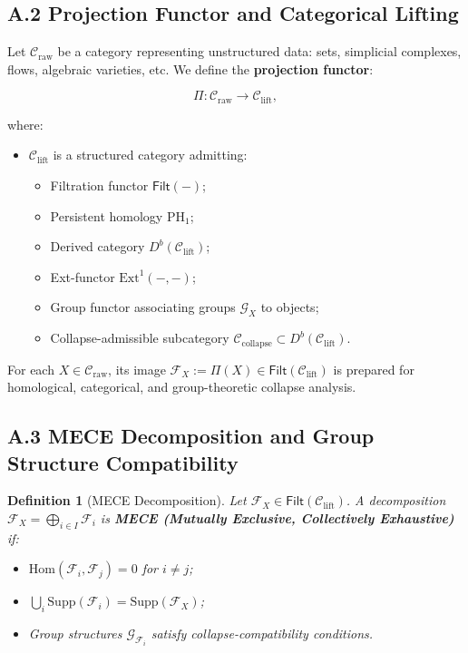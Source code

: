 \documentclass[11pt]{article}
\newtheorem{definition}[theorem]{Definition}
\begin{document}
\subsection*{A.2 Projection Functor and Categorical Lifting}

Let \( \mathcal{C}_{\mathrm{raw}} \) be a category representing unstructured data: sets, simplicial complexes, flows, algebraic varieties, etc. We define the \textbf{projection functor}:

\[
\Pi : \mathcal{C}_{\mathrm{raw}} \longrightarrow \mathcal{C}_{\mathrm{lift}},
\]

where:

\begin{itemize}
    \item \( \mathcal{C}_{\mathrm{lift}} \) is a structured category admitting:
    \begin{itemize}
        \item Filtration functor \( \mathsf{Filt}(-) \);
        \item Persistent homology \( \mathrm{PH}_1 \);
        \item Derived category \( D^b(\mathcal{C}_{\mathrm{lift}}) \);
        \item Ext-functor \( \mathrm{Ext}^1(-, -) \);
        \item Group functor associating groups \( \mathcal{G}_X \) to objects;
        \item Collapse-admissible subcategory \( \mathcal{C}_{\mathrm{collapse}} \subset D^b(\mathcal{C}_{\mathrm{lift}}) \).
    \end{itemize}
\end{itemize}

For each \( X \in \mathcal{C}_{\mathrm{raw}} \), its image \( \mathcal{F}_X := \Pi(X) \in \mathsf{Filt}(\mathcal{C}_{\mathrm{lift}}) \) is prepared for homological, categorical, and group-theoretic collapse analysis.

\subsection*{A.3 MECE Decomposition and Group Structure Compatibility}

\begin{definition}[MECE Decomposition]
Let \( \mathcal{F}_X \in \mathsf{Filt}(\mathcal{C}_{\mathrm{lift}}) \). A decomposition \( \mathcal{F}_X = \bigoplus_{i \in I} \mathcal{F}_i \) is \textbf{MECE (Mutually Exclusive, Collectively Exhaustive)} if:

\begin{itemize}
    \item \( \mathrm{Hom}(\mathcal{F}_i, \mathcal{F}_j) = 0 \) for \( i \neq j \);
    \item \( \bigcup_i \mathrm{Supp}(\mathcal{F}_i) = \mathrm{Supp}(\mathcal{F}_X) \);
    \item Group structures \( \mathcal{G}_{\mathcal{F}_i} \) satisfy collapse-compatibility conditions.
\end{itemize}
\end{definition}
\end{document}
